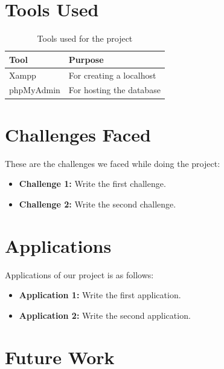\clearpage

\section{Tools Used}

\begin{table}[H]
\centering
\caption{Tools used for the project}
\label{my-label}
\begin{tabular}{|l|l|}
\hline
\textbf{Tool} & \textbf{Purpose}         \\ \hline
Xampp         & For creating a localhost \\ \hline
phpMyAdmin    & For hosting the database \\ \hline
\end{tabular}
\end{table}

\clearpage

\section{Challenges Faced}
These are the challenges we faced while doing the project:
\begin{itemize}
\item \textbf{Challenge 1: } Write the first challenge.
\item \textbf{Challenge 2: } Write the second challenge.
\end{itemize}

\clearpage

\section{Applications}

Applications of our project is as follows:
\begin{itemize}
\item \textbf{Application 1: } Write the first application.
\item \textbf{Application 2: } Write the second application.
\end{itemize}

\clearpage

\section{Future Work}


\clearpage



